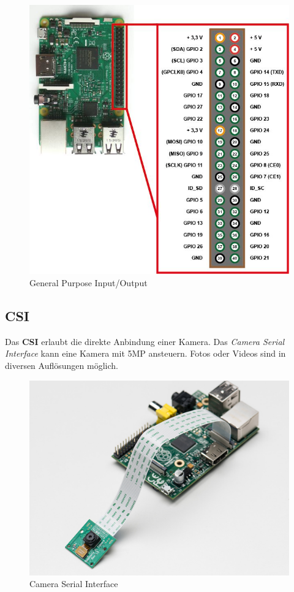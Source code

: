 \documentclass[12pt,a4paper]{article}
\begin{document}
\begin{figure}[H]
\centering
\includegraphics[scale=.5]{gpio}
\caption{General Purpose Input/Output}
\label{fig:gpio}
\end{figure}

\subsection{CSI}

Das \textbf{CSI} erlaubt die direkte Anbindung einer Kamera. Das \textit{Camera Serial Interface} kann eine Kamera mit 5MP ansteuern. Fotos oder Videos sind in diversen Auflösungen möglich.

\begin{figure}[H]
\centering
\includegraphics[scale=.8]{csi}
\caption{Camera Serial Interface}
\label{fig:gpio}
\end{figure}
\end{document}
